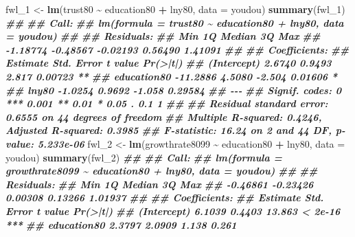 \documentclass[
]{book}
\newenvironment{Shaded}{\begin{snugshade}}{\end{snugshade}}
\newcommand{\AttributeTok}[1]{\textcolor[rgb]{0.13,0.29,0.53}{#1}}
\newcommand{\DocumentationTok}[1]{\textcolor[rgb]{0.56,0.35,0.01}{\textbf{\textit{#1}}}}
\newcommand{\FunctionTok}[1]{\textcolor[rgb]{0.13,0.29,0.53}{\textbf{#1}}}
\newcommand{\NormalTok}[1]{#1}
\newcommand{\OtherTok}[1]{\textcolor[rgb]{0.56,0.35,0.01}{#1}}
\newcommand{\SpecialCharTok}[1]{\textcolor[rgb]{0.81,0.36,0.00}{\textbf{#1}}}
\begin{document}
\begin{Shaded}
\begin{Highlighting}[]
\NormalTok{fwl\_1 }\OtherTok{\textless{}{-}} \FunctionTok{lm}\NormalTok{(trust80 }\SpecialCharTok{\textasciitilde{}}\NormalTok{ education80 }\SpecialCharTok{+}\NormalTok{ lny80, }\AttributeTok{data =}\NormalTok{ youdou)}
\FunctionTok{summary}\NormalTok{(fwl\_1)}
\DocumentationTok{\#\# }
\DocumentationTok{\#\# Call:}
\DocumentationTok{\#\# lm(formula = trust80 \textasciitilde{} education80 + lny80, data = youdou)}
\DocumentationTok{\#\# }
\DocumentationTok{\#\# Residuals:}
\DocumentationTok{\#\#      Min       1Q   Median       3Q      Max }
\DocumentationTok{\#\# {-}1.18774 {-}0.48567 {-}0.02193  0.56490  1.41091 }
\DocumentationTok{\#\# }
\DocumentationTok{\#\# Coefficients:}
\DocumentationTok{\#\#             Estimate Std. Error t value Pr(\textgreater{}|t|)   }
\DocumentationTok{\#\# (Intercept)   2.6740     0.9493   2.817  0.00723 **}
\DocumentationTok{\#\# education80 {-}11.2886     4.5080  {-}2.504  0.01606 * }
\DocumentationTok{\#\# lny80        {-}1.0254     0.9692  {-}1.058  0.29584   }
\DocumentationTok{\#\# {-}{-}{-}}
\DocumentationTok{\#\# Signif. codes:  0 \textquotesingle{}***\textquotesingle{} 0.001 \textquotesingle{}**\textquotesingle{} 0.01 \textquotesingle{}*\textquotesingle{} 0.05 \textquotesingle{}.\textquotesingle{} 0.1 \textquotesingle{} \textquotesingle{} 1}
\DocumentationTok{\#\# }
\DocumentationTok{\#\# Residual standard error: 0.6555 on 44 degrees of freedom}
\DocumentationTok{\#\# Multiple R{-}squared:  0.4246, Adjusted R{-}squared:  0.3985 }
\DocumentationTok{\#\# F{-}statistic: 16.24 on 2 and 44 DF,  p{-}value: 5.233e{-}06}
\NormalTok{fwl\_2 }\OtherTok{\textless{}{-}} \FunctionTok{lm}\NormalTok{(growthrate8099 }\SpecialCharTok{\textasciitilde{}}\NormalTok{ education80 }\SpecialCharTok{+}\NormalTok{ lny80, }\AttributeTok{data =}\NormalTok{ youdou)}
\FunctionTok{summary}\NormalTok{(fwl\_2)}
\DocumentationTok{\#\# }
\DocumentationTok{\#\# Call:}
\DocumentationTok{\#\# lm(formula = growthrate8099 \textasciitilde{} education80 + lny80, data = youdou)}
\DocumentationTok{\#\# }
\DocumentationTok{\#\# Residuals:}
\DocumentationTok{\#\#      Min       1Q   Median       3Q      Max }
\DocumentationTok{\#\# {-}0.46861 {-}0.23426  0.00308  0.13266  1.01937 }
\DocumentationTok{\#\# }
\DocumentationTok{\#\# Coefficients:}
\DocumentationTok{\#\#             Estimate Std. Error t value Pr(\textgreater{}|t|)    }
\DocumentationTok{\#\# (Intercept)   6.1039     0.4403  13.863  \textless{} 2e{-}16 ***}
\DocumentationTok{\#\# education80   2.3797     2.0909   1.138    0.261    }

\end{Highlighting}
\end{Shaded}
\end{document}
